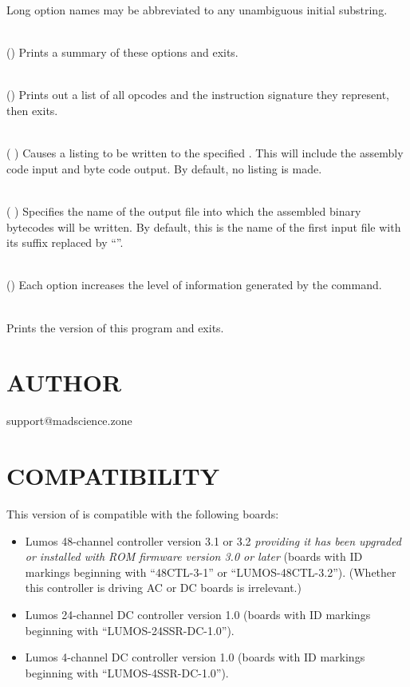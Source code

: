 Long option names may be abbreviated to any unambiguous initial substring.
\begin{list}{}{}
\item[{\codetype{----help}}]\hfill\\
()
Prints a summary of these options and exits.
\item[{\codetype{----list--opcodes}}]\hfill\\
()
Prints out a list of all opcodes and the instruction signature they
represent, then exits.
\item[{\codetype{----listing=}\Var*{file}}]\hfill\\
(
)
Causes a listing to be written to the specified 
.
This will include the assembly code input and byte code output.
By default, no listing is made.
\item[{\codetype{----output=}\Var*{file}}]\hfill\\
(
)
Specifies the name of the output file into which the assembled
binary bytecodes will be written.  By default, this is the name of
the first input file with its suffix replaced by 
``''.
\item[{\codetype{----verbose}}]\hfill\\
()
Each 
option increases the level of information generated by the
command.
\item[{\codetype{----version}}]\hfill\\
Prints the version of this program and exits.
\end{list}
\section*{AUTHOR}


support@madscience.zone
\section*{COMPATIBILITY}


This version of 
is compatible with the following boards:
\begin{itemize}
\item
Lumos 48-channel controller version 3.1 or 3.2
\emph{providing it has been upgraded or installed with ROM firmware version 3.0 or later}
(boards with ID markings beginning with ``48CTL-3-1'' or ``LUMOS-48CTL-3.2'').  (Whether this controller is
driving AC or DC boards is irrelevant.)
\item
Lumos 24-channel DC controller version 1.0 (boards with ID markings beginning with
``LUMOS-24SSR-DC-1.0'').
\item
Lumos 4-channel DC controller version 1.0 (boards with ID markings beginning with
``LUMOS-4SSR-DC-1.0'').
\end{itemize}
